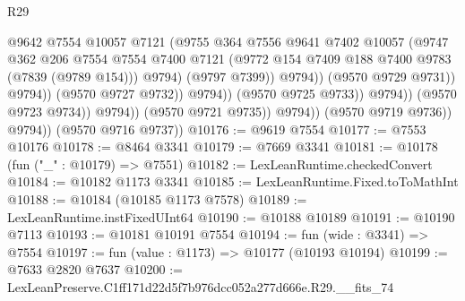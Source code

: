 \begin{lexlean}{R29}
\begin{coremodule}
                                              @9642
                                              @7554
                                              @10057
                                              @7121
                                              (@9755
                                                @364
                                                @7556
                                                @9641
                                                @7402
                                                @10057
                                                (@9747
                                                  @362
                                                  @206
                                                  @7554
                                                  @7554
                                                  @7400
                                                  @7121
                                                  (@9772
                                                    @154
                                                    @7409
                                                    @188
                                                    @7400
                                                    @9783
                                                    (@7839 (@9789 @154)))
                                                  @9794)
                                                (@9797 @7399))
                                              @9794))
                                          (@9570 @9729 @9731))
                                        @9794))
                                    (@9570 @9727 @9732))
                                  @9794))
                              (@9570 @9725 @9733))
                            @9794))
                        (@9570 @9723 @9734))
                      @9794))
                  (@9570 @9721 @9735))
                @9794))
            (@9570 @9719 @9736))
          @9794))
      (@9570 @9716 @9737))
@10176 := @9619 @7554
@10177 := @7553 @10176
@10178 := @8464 @3341
@10179 := @7669 @3341
@10181 := @10178 (fun ("_" : @10179) => @7551)
@10182 := LexLeanRuntime.checkedConvert
@10184 := @10182 @1173 @3341
@10185 := LexLeanRuntime.Fixed.toToMathInt
@10188 := @10184 (@10185 @1173 @7578)
@10189 := LexLeanRuntime.instFixedUInt64
@10190 := @10188 @10189
@10191 := @10190 @7113
@10193 := @10181 @10191 @7554
@10194 := fun (wide : @3341) => @7554
@10197 := fun (value : @1173) => @10177 (@10193 @10194)
@10199 := @7633 @2820 @7637
@10200 := LexLeanPreserve.C1ff171d22d5f7b976dcc052a277d666e.R29.__fits_74

\end{coremodule}
\end{lexlean}

